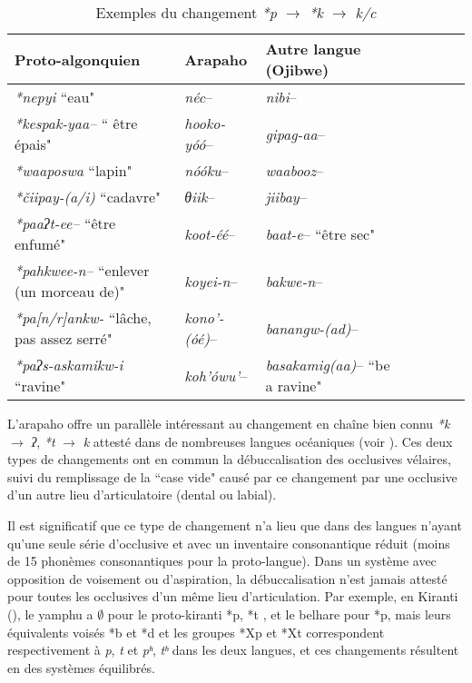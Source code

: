 \documentclass[twoside,a4paper,11pt]{article}
\newcommand{\ipa}[1]{{\phon\textit{#1}}}
\newcommand{\Σ}{\greek{Σ}}
\begin{document}
 \begin{table}[h]
\caption{Exemples du changement \ipa{*p} $\rightarrow$ \ipa{*k} $\rightarrow$  \ipa{k/c}} \centering  \label{tab:p.k}
\begin{tabular}{lllllll}
\toprule
Proto-algonquien & Arapaho & Autre langue (Ojibwe)\\
\midrule
  \ipa{*nepyi} ``eau" & \textit{néc}--    &  \textit{nibi}-- \\
 \ipa{*kespak-yaa--} `` être épais" & \textit{hooko-yóó}--    &  \textit{gipag-aa}-- \\
 \ipa{*waaposwa} ``lapin" & \textit{nóóku}--    &  \textit{waabooz}-- \\
  \ipa{*čiipay-(a/i)} ``cadavre" & \textit{θiik}--    &  \textit{jiibay}-- \\
  \ipa{*paaʔt-ee--} ``être enfumé" & \textit{koot-éé}--    &  \textit{baat-e}-- ``être sec"\\
    \ipa{*pahkwee-n--} ``enlever (un morceau de)" & \textit{koyei-n}--    &  \textit{bakwe-n}-- \\
        \ipa{*pa[n/r]ankw-} ``lâche, pas assez serré" & \textit{kono'-(óé)}--    &  \textit{banangw-(ad)}-- \\ 
   \ipa{*paʔs-askamikw-i} ``ravine" & \textit{koh'ówu'}--    &  \textit{basakamig(aa)}-- ``be a ravine"\\ 
\bottomrule
\end{tabular}
\end{table}

L'arapaho offre un parallèle intéressant au changement en chaîne bien connu \ipa{*k} $\rightarrow$ \ipa{ʔ},  \ipa{*t} $\rightarrow$ \ipa{k}  attesté dans de nombreuses langues océaniques (voir \citealt{blust04tk}). Ces deux types de changements ont en commun la débuccalisation des occlusives vélaires, suivi du remplissage de la ``case vide" causé par ce changement par une occlusive d'un autre lieu d'articulatoire (dental ou labial). 


Il est significatif que ce type de changement n'a lieu que dans des langues n'ayant qu'une seule série d'occlusive et avec un inventaire consonantique réduit (moins de 15 phonèmes consonantiques pour la proto-langue). Dans un système avec opposition de voisement ou d'aspiration, la débuccalisation n'est jamais attesté pour toutes les occlusives d'un même lieu d'articulation. Par exemple, en Kiranti (\citealt{michailovsky94stops}), le yamphu a $\emptyset$ pour le proto-kiranti *p, *t , et le belhare pour  *p, mais leurs équivalents voisés *b et *d et les groupes *Xp et *Xt correspondent respectivement à \ipa{p}, \ipa{t} et \ipa{pʰ}, \ipa{tʰ} dans les deux langues, et ces changements résultent en des systèmes équilibrés.
\end{document}
